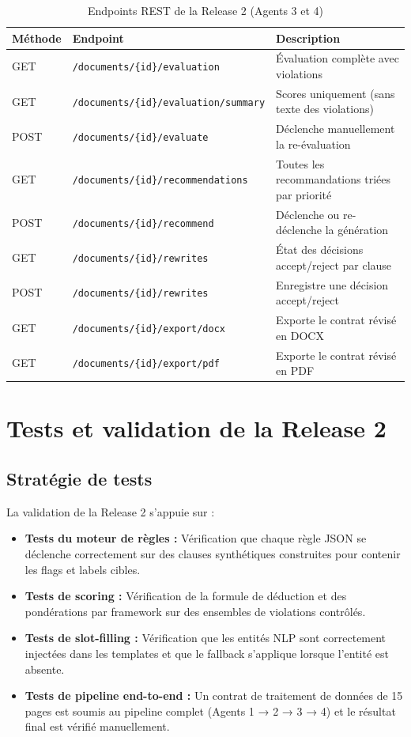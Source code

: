 \begin{table}[H]
\centering
\small
\renewcommand{\arraystretch}{1.4}
\begin{tabular}{|p{1.5cm}|p{5.5cm}|p{7cm}|}
\hline
\textbf{Méthode} & \textbf{Endpoint} & \textbf{Description} \\
\hline
GET & \texttt{/documents/\{id\}/evaluation} & Évaluation complète avec violations \\
\hline
GET & \texttt{/documents/\{id\}/evaluation/summary} & Scores uniquement (sans texte des violations) \\
\hline
POST & \texttt{/documents/\{id\}/evaluate} & Déclenche manuellement la re-évaluation \\
\hline
GET & \texttt{/documents/\{id\}/recommendations} & Toutes les recommandations triées par priorité \\
\hline
POST & \texttt{/documents/\{id\}/recommend} & Déclenche ou re-déclenche la génération \\
\hline
GET & \texttt{/documents/\{id\}/rewrites} & État des décisions accept/reject par clause \\
\hline
POST & \texttt{/documents/\{id\}/rewrites} & Enregistre une décision accept/reject \\
\hline
GET & \texttt{/documents/\{id\}/export/docx} & Exporte le contrat révisé en DOCX \\
\hline
GET & \texttt{/documents/\{id\}/export/pdf} & Exporte le contrat révisé en PDF \\
\hline
\end{tabular}
\caption{Endpoints REST de la Release 2 (Agents 3 et 4)}
\label{tab:api_r2}
\end{table}

\section{Tests et validation de la Release 2}

\subsection{Stratégie de tests}

La validation de la Release 2 s'appuie sur :
\begin{itemize}
    \item \textbf{Tests du moteur de règles :} Vérification que chaque règle JSON se déclenche correctement sur des clauses synthétiques construites pour contenir les flags et labels cibles.
    \item \textbf{Tests de scoring :} Vérification de la formule de déduction et des pondérations par framework sur des ensembles de violations contrôlés.
    \item \textbf{Tests de slot-filling :} Vérification que les entités NLP sont correctement injectées dans les templates et que le fallback s'applique lorsque l'entité est absente.
    \item \textbf{Tests de pipeline end-to-end :} Un contrat de traitement de données de 15 pages est soumis au pipeline complet (Agents 1 → 2 → 3 → 4) et le résultat final est vérifié manuellement.
\end{itemize}

